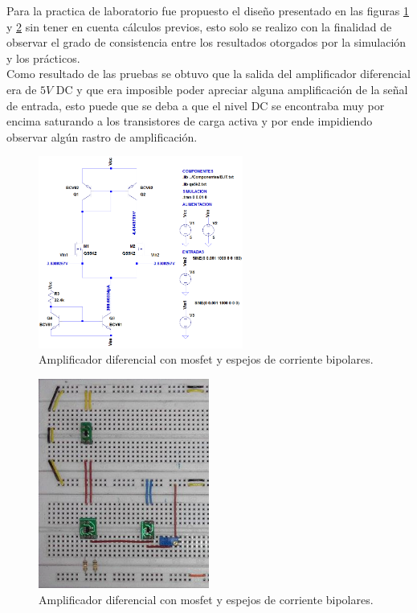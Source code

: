 Para la practica de laboratorio fue propuesto el diseño presentado en las figuras \ref{ampdifmosfetactloadsim} y \ref{ampdifmosfetactloadproto} sin tener en cuenta cálculos previos, esto solo se realizo con la finalidad de observar el grado de consistencia entre los resultados otorgados por la simulación y los prácticos. \\

Como resultado de las pruebas se obtuvo que la salida del amplificador diferencial era de $5 V$ DC y que era imposible poder apreciar alguna amplificación de la señal de entrada, esto puede que se deba a que el nivel DC se encontraba muy por encima saturando a los transistores de carga activa y por ende impidiendo observar algún rastro de amplificación.

\begin{figure}[H]
  \centering
  \includegraphics[width=0.6\textwidth]{Capitulo_2/ampdifmosfet.png}
  \caption{Amplificador diferencial con mosfet y espejos de corriente bipolares.}
  \label{ampdifmosfetactloadsim} 
\end{figure}

\begin{figure}[H]
  \centering
  \includegraphics[width=0.5\textwidth]{Capitulo_2/pro_ampdifmosfet.png}
  \caption{Amplificador diferencial con mosfet y espejos de corriente bipolares.}
  \label{ampdifmosfetactloadproto} 
\end{figure}


